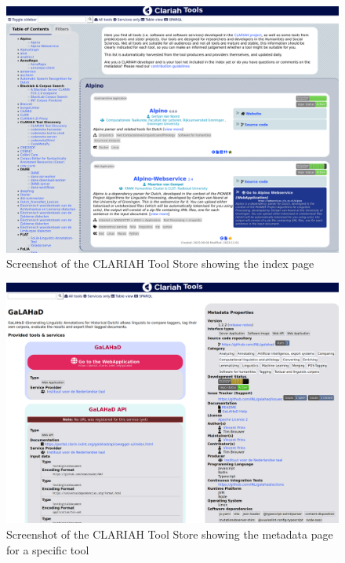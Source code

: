 \documentclass[a4paper,11pt]{article}
\begin{document}
\begin{figure}[h]
\begin{center}
\includegraphics[width=14.0cm]{screenshot.png}
\caption{Screenshot of the CLARIAH Tool Store showing the index page}
\end{center}
\label{fig:toolstore1}
\end{figure}

\begin{figure}[h!]
\begin{center}
\includegraphics[width=14.0cm]{screenshot2.png}
\caption{Screenshot of the CLARIAH Tool Store showing the metadata page for a specific tool}
\end{center}
\label{fig:toolstore2}
\end{figure}
\end{document}
